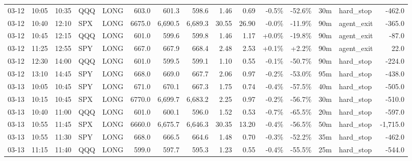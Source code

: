 \documentclass[11pt,a4paper,twoside]{article}
\begin{document}
\begin{landscape}
\begin{center}
\begin{longtable}{>{\color{txtmain}}l l l l l r r r r r r r r >{\color{txtmain}}l r}
03-12 & 10:05 & 10:35 & QQQ & LONG & 603.0 & 601.3 & 598.6 & 1.46 & 0.69 & \textcolor{lossred}{-0.5\%} & \textcolor{lossred}{-52.6\%} & 30m & hard\_stop & \textcolor{lossred}{-462.0} \\
03-12 & 10:40 & 12:10 & SPX & LONG & 6675.0 & 6,690.5 & 6,689.3 & 30.55 & 26.90 & \textcolor{lossred}{-0.0\%} & \textcolor{lossred}{-11.9\%} & 90m & agent\_exit & \textcolor{lossred}{-365.0} \\
03-12 & 10:45 & 12:15 & QQQ & LONG & 601.0 & 599.6 & 599.8 & 1.46 & 1.17 & \textcolor{wingreen}{+0.0\%} & \textcolor{lossred}{-19.8\%} & 90m & agent\_exit & \textcolor{lossred}{-87.0} \\
03-12 & 11:25 & 12:55 & SPY & LONG & 667.0 & 667.9 & 668.4 & 2.48 & 2.53 & \textcolor{wingreen}{+0.1\%} & \textcolor{wingreen}{+2.2\%} & 90m & agent\_exit & \textcolor{wingreen}{22.0} \\
03-12 & 12:30 & 14:00 & QQQ & LONG & 601.0 & 599.5 & 599.1 & 1.10 & 0.55 & \textcolor{lossred}{-0.1\%} & \textcolor{lossred}{-50.7\%} & 90m & hard\_stop & \textcolor{lossred}{-224.0} \\
03-12 & 13:10 & 14:45 & SPY & LONG & 668.0 & 669.0 & 667.7 & 2.06 & 0.97 & \textcolor{lossred}{-0.2\%} & \textcolor{lossred}{-53.0\%} & 95m & hard\_stop & \textcolor{lossred}{-438.0} \\
03-13 & 10:05 & 10:45 & SPY & LONG & 671.0 & 670.1 & 667.3 & 1.75 & 0.74 & \textcolor{lossred}{-0.4\%} & \textcolor{lossred}{-57.5\%} & 40m & hard\_stop & \textcolor{lossred}{-505.0} \\
03-13 & 10:15 & 10:45 & SPX & LONG & 6770.0 & 6,699.7 & 6,683.2 & 2.25 & 0.97 & \textcolor{lossred}{-0.2\%} & \textcolor{lossred}{-56.7\%} & 30m & hard\_stop & \textcolor{lossred}{-510.0} \\
03-13 & 10:40 & 11:00 & QQQ & LONG & 601.0 & 600.1 & 596.0 & 1.52 & 0.53 & \textcolor{lossred}{-0.7\%} & \textcolor{lossred}{-65.5\%} & 20m & hard\_stop & \textcolor{lossred}{-597.0} \\
03-13 & 10:55 & 11:45 & SPX & LONG & 6660.0 & 6,675.7 & 6,646.3 & 30.35 & 13.20 & \textcolor{lossred}{-0.4\%} & \textcolor{lossred}{-56.5\%} & 50m & hard\_stop & \textcolor{lossred}{-1,715.0} \\
03-13 & 10:55 & 11:30 & SPY & LONG & 668.0 & 666.5 & 664.6 & 1.48 & 0.70 & \textcolor{lossred}{-0.3\%} & \textcolor{lossred}{-52.2\%} & 35m & hard\_stop & \textcolor{lossred}{-462.0} \\
03-13 & 11:15 & 11:40 & QQQ & LONG & 599.0 & 597.7 & 595.3 & 1.23 & 0.55 & \textcolor{lossred}{-0.4\%} & \textcolor{lossred}{-55.5\%} & 25m & hard\_stop & \textcolor{lossred}{-544.0} \\

\end{longtable}
\end{center}
\end{landscape}
\end{document}
